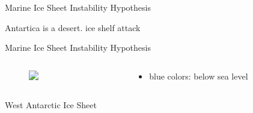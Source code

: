 \documentclass[hide notes,intlimits]{beamer}
\begin{document}
\begin{frame}{Marine Ice Sheet Instability Hypothesis}
 \begin{figure}
  \end{figure}
  Antartica is a desert. ice shelf attack
\end{frame}


\begin{frame}{Marine Ice Sheet Instability Hypothesis}
  \begin{columns}[c]
    \begin{column}{.65\linewidth}
      \begin{figure}
        \includegraphics<1>[height=8cm]{ant-marine}
      \end{figure}
    \end{column}
    \begin{column}{.38\linewidth}
      \begin{itemize}
      \item blue colors: below sea level
      \end{itemize}
    \end{column}
  \end{columns}
\end{frame}

\begin{frame}{West Antarctic Ice Sheet}
\end{frame}
\end{document}
